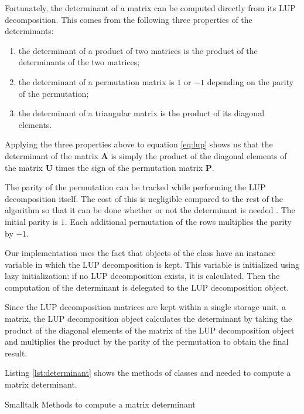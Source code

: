 Fortunately, the determinant of a matrix can be computed directly
from its LUP decomposition. This comes from the following three
properties of the determinants:
\begin{enumerate}
  \item the determinant of a product of two matrices is the product of the determinants of the two
  matrices;
  \item the determinant of a permutation matrix is $1$ or $-1$ depending on the parity of the
  permutation;
  \item the determinant of a triangular matrix is the product of its diagonal elements.
\end{enumerate}
Applying the three properties above to equation \ref{eq:lup} shows
us that the determinant of the matrix $\textbf{A}$ is simply the
product of the diagonal elements of the matrix $\textbf{U}$ times the
sign of the permutation matrix $\textbf{P}$.

The parity of the permutation can be tracked while performing the
LUP decomposition itself. The cost of this is negligible compared
to the rest of the algorithm so that it can be done whether or not
the determinant is needed . The initial parity is $1$. Each
additional permutation of the rows multiplies the parity by $-1$.

Our implementation uses the fact that objects of the class  have an instance variable in which the LUP decomposition
is kept. This variable is initialized using lazy initialization:
if no LUP decomposition exists, it is calculated. Then the
computation of the determinant is delegated to the LUP
decomposition object.

Since the LUP decomposition matrices are kept within a single
storage unit, a matrix, the LUP decomposition object calculates
the determinant by taking the product of the diagonal elements of
the matrix of the LUP decomposition object and multiplies the
product by the parity of the permutation to obtain the final
result.

Listing \ref{lst:determinant} shows the methods of classes  and  needed to compute a matrix determinant.

\begin{listing}[label=lst:determinant]{Smalltalk}
{Methods to compute a matrix determinant}
%
%
\end{listing}

